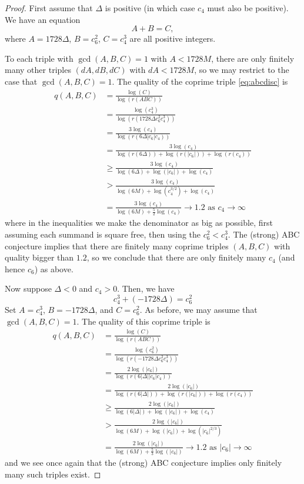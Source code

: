 \documentclass{book}
\begin{document}
\begin{proof}
First assume that $\Delta$ is positive (in which case $c_4$ must also be positive).
We have an equation
\begin{equation}\label{eq:abcdisc}
  A + B = C,
\end{equation}
where $A = 1728\Delta$, $B=c_6^2$, $C=c_4^3$ are all positive integers.

To each triple with $\gcd(A,B,C)=1$
with $A<1728 M$,
there are only finitely many other triples
$(dA,dB,dC)$ with $dA<1728 M$, so
we may restrict to the case that $\gcd(A,B,C)=1$.
The quality of the coprime triple \eqref{eq:abcdisc} is
\begin{align*}
  q(A,B,C) &= \frac{\log(C)}{\log(r(ABC))}\\
      &= \frac{\log(c_4^3)}{\log(r(1728\Delta c_6^2 c_4^3))}\\
      &= \frac{3\log(c_4)}{\log(r(6\Delta |c_6| c_4))}\\
      &= \frac{3\log(c_4)}{\log(r(6\Delta)) + \log(r(|c_6|)) +
         \log(r( c_4))}\\
      &\geq  \frac{3\log(c_4)}{\log(6\Delta) + \log(|c_6|) +
         \log(c_4)}\\
      &> \frac{3\log(c_4)}{\log(6M) + \log(c_4^{3/2}) +
         \log(c_4)}\\
      &= \frac{3\log(c_4)}{\log(6M) + \frac{5}{2}\log(c_4)}
      \to 1.2 \text{ as $c_4\to\infty$}
\end{align*}
where in the inequalities we make the denominator
as big as possible, first assuming each summand is square
free, then using the $c_6^2 < c_4^3$.
The (strong) ABC conjecture implies
that there are finitely many coprime triples $(A,B,C)$
with quality bigger than $1.2$, so we conclude
that there are only finitely many
$c_4$ (and hence $c_6$) as above.

Now suppose $\Delta < 0$ and $c_4 > 0$.  Then, we have
$$
c_4^3 + (-1728 \Delta) = c_6^2
$$
Set $A = c_4^3$, $B = -1728 \Delta$, and $C = c_6^2$.
As before, we may assume that
$\gcd(A,B,C) = 1$.  The quality of this coprime triple is
\begin{align*}
  q(A,B,C) &= \frac{\log(C)}{\log(r(ABC))}\\
      &= \frac{\log(c_6^2)}{\log(r(-1728\Delta c_6^2 c_4^3))}\\
      &= \frac{2\log(|c_6|)}{\log(r(6|\Delta| |c_6| c_4))}\\
      &= \frac{2\log(|c_6|)}{\log(r(6|\Delta|)) + \log(r(|c_6|)) +
         \log(r( c_4))}\\
      &\geq  \frac{2\log(|c_6|)}{\log(6|\Delta|) + \log(|c_6|) +
         \log(c_4)}\\
      &> \frac{2\log(|c_6|)}{\log(6M) +
         \log(|c_6|) + \log(|c_6|^{2/3}) }\\
      &= \frac{2\log(|c_6|)}{\log(6M) + \frac{5}{3}\log(|c_6|)}
      \to 1.2 \text{ as $|c_6|\to\infty$}
\end{align*}
and we see once again that the (strong) ABC conjecture implies only
finitely many such triples exist.


\end{proof}
\end{document}
